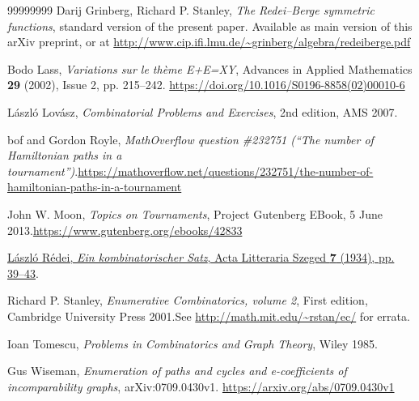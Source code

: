 \documentclass[numbers=enddot,12pt,final,onecolumn,notitlepage]{scrartcl}%
\numberwithin{exer}{section}
\theoremstyle{definition}
\newenvironment{verlong}{}{}
\begin{document}
\begin{thebibliography}{99999999}
\begin{verlong}
%
Darij
Grinberg, Richard P. Stanley, \textit{The Redei--Berge symmetric functions},
standard version of the present paper.
Available as main version of this arXiv preprint, or at
\url{http://www.cip.ifi.lmu.de/~grinberg/algebra/redeiberge.pdf}
\end{verlong}

%
Bodo Lass,
\textit{Variations sur le th\`{e}me E+E=XY}, Advances in Applied Mathematics
\textbf{29} (2002), Issue 2, pp. 215--242.
\url{https://doi.org/10.1016/S0196-8858(02)00010-6}

L\'{a}szl\'{o} Lov\'{a}sz, \textit{Combinatorial
Problems and Exercises}, 2nd edition, AMS 2007.

bof and Gordon Royle, \textit{MathOverflow
question \#232751 (\textquotedblleft The number of Hamiltonian paths in a
tournament\textquotedblright)}.\newline\url{https://mathoverflow.net/questions/232751/the-number-of-hamiltonian-paths-in-a-tournament}

John W. Moon, \textit{Topics on Tournaments}, Project
Gutenberg EBook, 5 June 2013.\newline\url{https://www.gutenberg.org/ebooks/42833}

%
\href{http://acta.bibl.u-szeged.hu/13432/}{L\'{a}szl\'{o} R\'{e}dei,
\textit{Ein kombinatorischer Satz}, Acta Litteraria Szeged \textbf{7} (1934),
pp. 39--43}.

Richard P. Stanley, \textit{Enumerative Combinatorics,
volume 2}, First edition, Cambridge University Press 2001.\newline See
\url{http://math.mit.edu/~rstan/ec/} for errata.

Ioan Tomescu, \textit{Problems in Combinatorics
and Graph Theory}, Wiley 1985.

Gus
Wiseman, \textit{Enumeration of paths and cycles and e-coefficients of
incomparability graphs}, arXiv:0709.0430v1.
\url{https://arxiv.org/abs/0709.0430v1}
\end{thebibliography}
\end{document}
